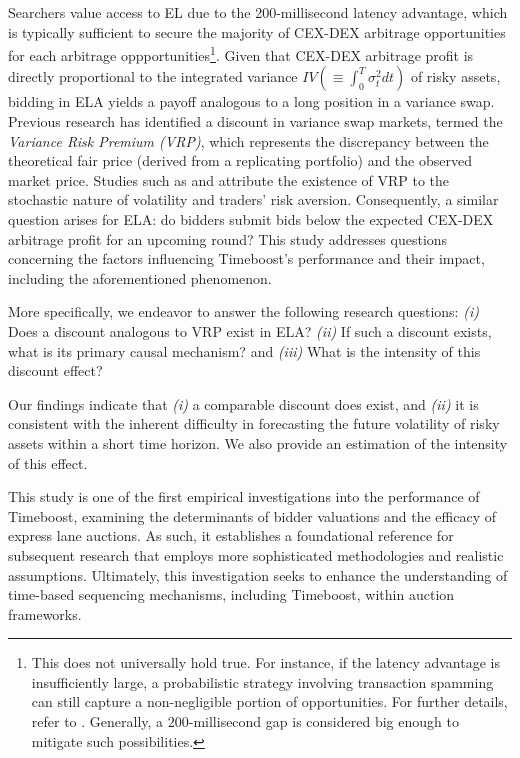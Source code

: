\documentclass[runningheads]{llncs}
\begin{document}
Searchers value access to EL due to the 200-millisecond latency advantage, which is typically sufficient to secure the majority of CEX-DEX arbitrage opportunities for each arbitrage oppportunities\footnote{This does not universally hold true. For instance, if the latency advantage is insufficiently large, a probabilistic strategy involving transaction spamming can still capture a non-negligible portion of opportunities. For further details, refer to \cite{akaki2025blind}. Generally, a $200$-millisecond gap is considered big enough to mitigate such possibilities.}. Given that CEX-DEX arbitrage profit is directly proportional to the integrated variance $IV (\equiv \int^T_0 \sigma^2_t dt)$ of risky assets, bidding in ELA yields a payoff analogous to a long position in a variance swap. Previous research has identified a discount in variance swap markets, termed the \emph{Variance Risk Premium (VRP)}, which represents the discrepancy between the theoretical fair price (derived from a replicating portfolio) and the observed market price. Studies such as \cite{bollerslev2009expected} and \cite{carr2009variance} attribute the existence of VRP to the stochastic nature of volatility and traders' risk aversion. Consequently, a similar question arises for ELA: do bidders submit bids below the expected CEX-DEX arbitrage profit for an upcoming round? This study addresses questions concerning the factors influencing Timeboost's performance and their impact, including the aforementioned phenomenon.

More specifically, we endeavor to answer the following research questions: \emph{(i)} Does a discount analogous to VRP exist in ELA? \emph{(ii)} If such a discount exists, what is its primary causal mechanism? and \emph{(iii)} What is the intensity of this discount effect?

Our findings indicate that \emph{(i)} a comparable discount does exist, and \emph{(ii)} it is consistent with the inherent difficulty in forecasting the future volatility of risky assets within a short time horizon. We also provide an estimation of the intensity of this effect.

This study is one of the first empirical investigations into the performance of Timeboost, examining the determinants of bidder valuations and the efficacy of express lane auctions. As such, it establishes a foundational reference for subsequent research that employs more sophisticated methodologies and realistic assumptions. Ultimately, this investigation seeks to enhance the understanding of time-based sequencing mechanisms, including Timeboost, within auction frameworks.
\end{document}
